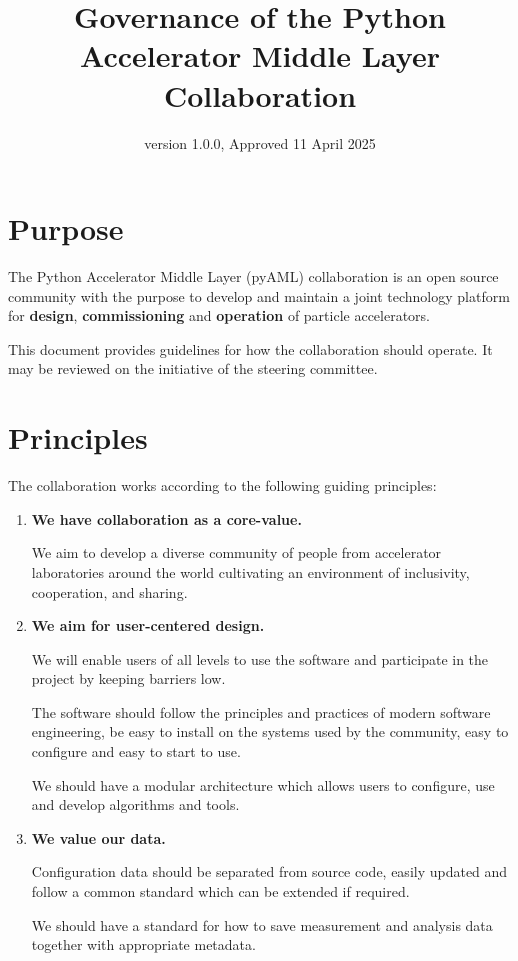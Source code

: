 \documentclass{article}
\title{Governance of the Python Accelerator Middle Layer Collaboration}
\date{version 1.0.0, Approved 11 April 2025}
\begin{document}
\maketitle



\section{Purpose}

The Python Accelerator Middle Layer (pyAML) collaboration is an open source community with the purpose to develop and maintain a joint technology platform for \textbf{design}, \textbf{commissioning} and \textbf{operation} of particle accelerators.

This document provides guidelines for how the collaboration should operate. It may be reviewed on the initiative of the steering committee.

\section{Principles}

The collaboration works according to the following guiding principles:

\begin{enumerate}
    \item \textbf{We have collaboration as a core-value.}
    
    We aim to develop a diverse community of people from accelerator laboratories around the world cultivating an environment of inclusivity, cooperation, and sharing.

    \item \textbf{We aim for user-centered design.}

    We will enable users of all levels to use the software and participate in the project by keeping barriers low.

    The software should follow the principles and practices of modern software engineering, be easy to install on the systems used by the community, easy to configure and easy to start to use.

    We should have a modular architecture which allows users to configure, use and develop algorithms and tools.

    \item \textbf{We value our data.}

    Configuration data should be separated from source code, easily updated and follow a common standard which can be extended if required.

    We should have a standard for how to save measurement and analysis data together with appropriate metadata.

\end{enumerate}
\end{document}
